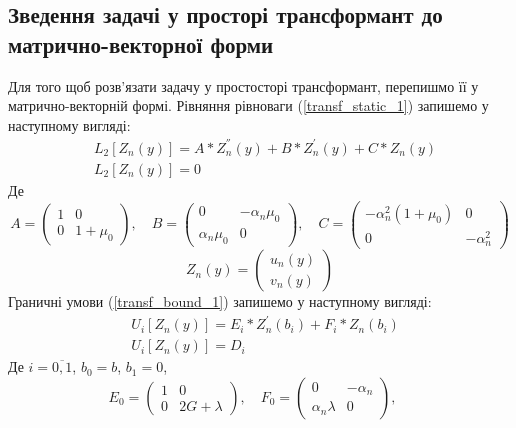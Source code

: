 \subsection{Зведення задачі у просторі трансформант до матрично-векторної форми}
Для того щоб розв'язати задачу у простосторі трансформант, перепишмо її у матрично-векторній формі.
Рівняння рівноваги (\ref{transf_static_1}) запишемо у наступному вигляді:
\begin{align}\label{transf_mat_1}
    &L_2\left[ Z_n(y) \right] = A * Z_n^{''}(y) + B * Z_n^{'}(y) + C * Z_n(y) \nonumber \\
    & L_2\left[ Z_n(y) \right] = 0
\end{align}
Де
\begin{equation*}
    A = \begin{pmatrix}
        1 & 0 \\
        0 & 1 + \mu_0
    \end{pmatrix}, \quad
    B = \begin{pmatrix}
        0 & -\alpha_n \mu_0 \\
        \alpha_n \mu_0 & 0
    \end{pmatrix}, \quad
    C = \begin{pmatrix}
        -\alpha_n^2(1 + \mu_0) & 0 \\
        0 & -\alpha_n^2
    \end{pmatrix}
\end{equation*}
\begin{equation*}
    Z_n(y) = \begin{pmatrix}
        u_n(y) \\
        v_n(y)
    \end{pmatrix}
\end{equation*}
Граничні умови (\ref{transf_bound_1}) запишемо у наступному вигляді:
\begin{align}\label{transf_bound_mat_1}
    &U_i\left[ Z_n(y) \right] = E_i * Z_n^{'}(b_i) + F_i * Z_n(b_i) \nonumber \\
    & U_i\left[ Z_n(y) \right] = D_i
\end{align}
Де $i = \overline{0, 1}$, $b_0 = b$, $b_1 = 0$,
\begin{equation*}
    E_0 = \begin{pmatrix}
        1 & 0 \\
        0 & 2G + \lambda
    \end{pmatrix}, \quad
    F_0 = \begin{pmatrix}
        0 & -\alpha_n \\
        \alpha_n \lambda & 0
    \end{pmatrix}, \quad
\end{equation*}
